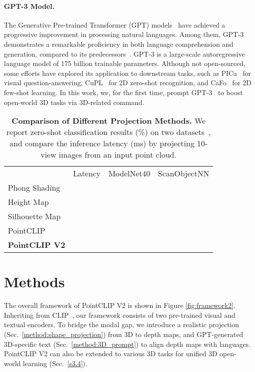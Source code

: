 \documentclass[10pt,twocolumn,letterpaper]{article}
\begin{document}
\paragraph{GPT-3 Model.} The Generative Pre-trained Transformer (GPT) models~\cite{radford2018improving, radford2019language, brown2020language} have achieved a progressive improvement in processing natural languages. Among them, GPT-3 demonstrates a remarkable proficiency in both language comprehension and generation, compared to its predecessors~\cite{radford2018improving, radford2019language, liu2019roberta, yang2019xlnet, raffel2020exploring}. GPT-3 is a large-scale autoregressive language model of 175 billion trainable parameters. Although not open-sourced, some efforts have explored its application to downstream tasks, such as PICa~\cite{yang2022empirical} for visual question-answering, CuPL~\cite{pratt2022Whatdoes} for 2D zero-shot recognition, and CaFo~\cite{zhang2023prompt} for 2D few-shot learning. In this work, we, for the first time, prompt GPT-3~\cite{brown2020language} to boost open-world 3D tasks via 3D-related command.

\begin{table}[t!]
\centering
\begin{adjustbox}{width=0.9\linewidth}
	\begin{tabular}{lccc}
	\toprule
		\makecell*[c]{Method} & Latency & ModelNet40 & ScanObjectNN \\ \cmidrule(lr){1-1} \cmidrule(lr){2-2} \cmidrule(lr){3-4}
		Phong Shading~\cite{su2015multi} &  &  & \\
		Height Map~\cite{su2018adeeper} &  &  & \\
		Silhouette Map~\cite{su2018adeeper} &  &  &  \\
		PointCLIP~\cite{zhang2022pointclip} &  &  & \\
		\textbf{PointCLIP V2} &  &  & \\
	\bottomrule
	\end{tabular}
\end{adjustbox}
\vspace{0.23cm}
\caption{\textbf{Comparison of Different Projection Methods.}
We report zero-shot classification results (\%) on two datasets~\cite{wu20153d, uy2019revisiting}, and compare the inference latency (ms) by projecting 10-view images from an input point cloud.}
\label{table:ablation_projection}
\vspace{-0.2cm}
\end{table}


\section{Methods}
\label{sec:methods}
The overall framework of PointCLIP V2 is shown in Figure \ref{fig:framework2}. Inheriting from CLIP~\cite{radford2021learning}, our framework consists of two pre-trained visual and textual encoders. To bridge the modal gap, we introduce a realistic projection (Sec.~\ref{method:shape_projection}) from 3D to depth maps, and GPT-generated 3D-specific text (Sec.~\ref{method:3D_prompt}) to align depth maps with languages. PointCLIP V2 can also be extended to various 3D tasks for unified 3D open-world learning (Sec.~\ref{s3.4}).
\end{document}
